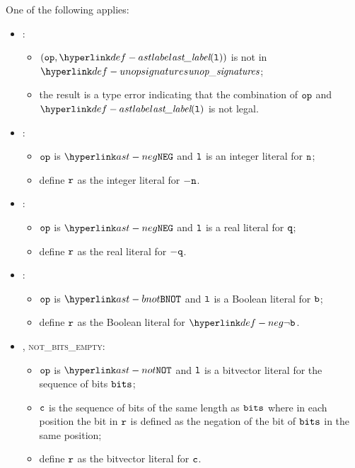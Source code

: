 \ProseParagraph
One of the following applies:
\begin{itemize}
  \item {}:
  \begin{itemize}
    \item $(\op, \astlabel(\vl))$ is not in $\unopsignatures$;
    \item the result is a type error indicating that the combination of $\texttt{op}$ and $\astlabel(\vl)$
          is not legal.
  \end{itemize}

  \item {}:
  \begin{itemize}
    \item $\texttt{op}$ is $\NEG$ and $\texttt{l}$ is an integer literal for $\texttt{n}$;
    \item define $\texttt{r}$ as the integer literal for $- \texttt{n}$.
  \end{itemize}

  \item {}:
  \begin{itemize}
    \item $\texttt{op}$ is $\NEG$ and $\texttt{l}$ is a real literal for $\texttt{q}$;
    \item define $\texttt{r}$ as the real literal for $- \texttt{q}$.
  \end{itemize}

  \item {}:
  \begin{itemize}
    \item $\texttt{op}$ is $\BNOT$ and $\texttt{l}$ is a Boolean literal for $\texttt{b}$;
    \item define $\texttt{r}$ as the Boolean literal for $\neg\vb$.
  \end{itemize}

  \item {}, \textsc{not\_bits\_empty}:
  \begin{itemize}
    \item $\texttt{op}$ is $\NOT$ and $\texttt{l}$ is a bitvector literal for the sequence of bits $\texttt{bits}$;
    \item $\texttt{c}$ is the sequence of bits of the same length as $\texttt{bits}$ where in each position
          the bit in $\texttt{r}$ is defined as the negation of the bit of $\texttt{bits}$ in the same position;
    \item define $\texttt{r}$ as the bitvector literal for $\texttt{c}$.
  \end{itemize}
\end{itemize}

